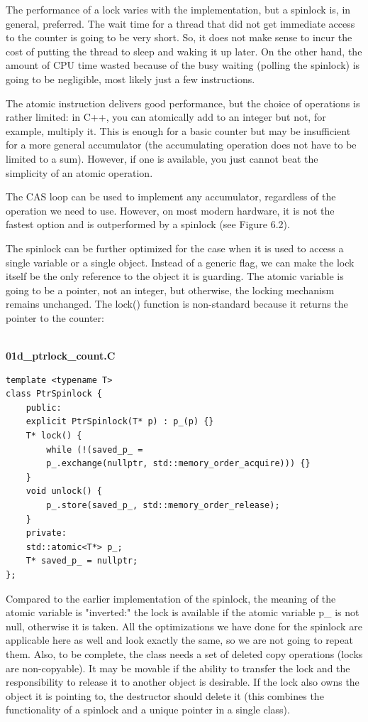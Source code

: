 The performance of a lock varies with the implementation, but a spinlock is, in general, preferred. The wait time for a thread that did not get immediate access to the counter is going to be very short. So, it does not make sense to incur the cost of putting the thread to sleep and waking it up later. On the other hand, the amount of CPU time wasted because of the busy waiting (polling the spinlock) is going to be negligible, most likely just a few instructions.

The atomic instruction delivers good performance, but the choice of operations is rather limited: in C++, you can atomically add to an integer but not, for example, multiply it. This is enough for a basic counter but may be insufficient for a more general accumulator (the accumulating operation does not have to be limited to a sum). However, if one is available, you just cannot beat the simplicity of an atomic operation.

The CAS loop can be used to implement any accumulator, regardless of the operation we need to use. However, on most modern hardware, it is not the fastest option and is outperformed by a spinlock (see Figure 6.2).

The spinlock can be further optimized for the case when it is used to access a single variable or a single object. Instead of a generic flag, we can make the lock itself be the only reference to the object it is guarding. The atomic variable is going to be a pointer, not an integer, but otherwise, the locking mechanism remains unchanged. The lock() function is non-standard because it returns the pointer to the counter:

\hspace*{\fill} \\ %
\noindent
\textbf{01d\_ptrlock\_count.C}
\begin{lstlisting}[style=styleCXX]
template <typename T>
class PtrSpinlock {
	public:
	explicit PtrSpinlock(T* p) : p_(p) {}
	T* lock() {
		while (!(saved_p_ =
		p_.exchange(nullptr, std::memory_order_acquire))) {}
	}
	void unlock() {
		p_.store(saved_p_, std::memory_order_release);
	}
	private:
	std::atomic<T*> p_;
	T* saved_p_ = nullptr;
};
\end{lstlisting}

Compared to the earlier implementation of the spinlock, the meaning of the atomic variable is "inverted:" the lock is available if the atomic variable p\_ is not null, otherwise it is taken. All the optimizations we have done for the spinlock are applicable here as well and look exactly the same, so we are not going to repeat them. Also, to be complete, the class needs a set of deleted copy operations (locks are non-copyable). It may be movable if the ability to transfer the lock and the responsibility to release it to another object is desirable. If the lock also owns the object it is pointing to, the destructor should delete it (this combines the functionality of a spinlock and a unique pointer in a single class).

